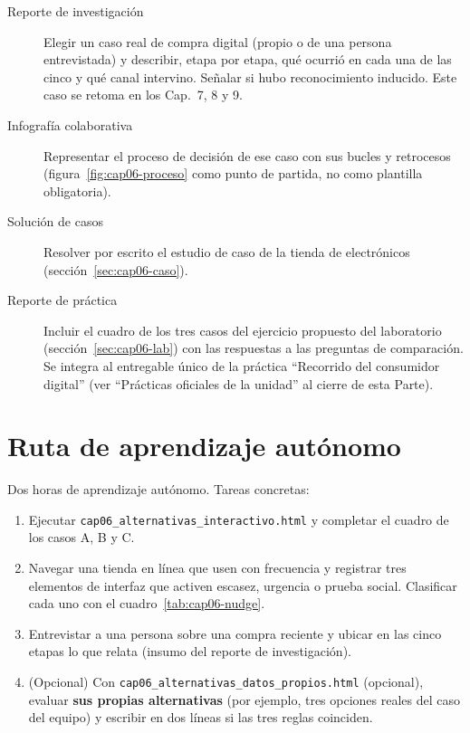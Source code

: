 \begin{description}
  \item[Reporte de investigación] Elegir un caso real de compra digital
  (propio o de una persona entrevistada) y describir, etapa por etapa, qué
  ocurrió en cada una de las cinco y qué canal intervino. Señalar si hubo
  reconocimiento inducido. Este caso se retoma en los Cap.~7, 8 y 9.
  \item[Infografía colaborativa] Representar el proceso de decisión de ese
  caso con sus bucles y retrocesos (figura~\ref{fig:cap06-proceso} como
  punto de partida, no como plantilla obligatoria).
  \item[Solución de casos] Resolver por escrito el estudio de caso de la
  tienda de electrónicos (sección~\ref{sec:cap06-caso}).
  \item[Reporte de práctica] Incluir el cuadro de los tres casos del
  ejercicio propuesto del laboratorio (sección~\ref{sec:cap06-lab}) con las respuestas a las
  preguntas de comparación. Se integra al entregable único de la práctica
  \enquote{Recorrido del consumidor digital} (ver \enquote{Prácticas
  oficiales de la unidad} al cierre de esta Parte).
\end{description}

\section{Ruta de aprendizaje autónomo}

Dos horas de aprendizaje autónomo. Tareas concretas:
\begin{enumerate}
  \item Ejecutar \texttt{cap06\_alternativas\_interactivo.html} y completar
  el cuadro de los casos A, B y C.
  \item Navegar una tienda en línea que usen con frecuencia y registrar tres
  elementos de interfaz que activen escasez, urgencia o prueba social.
  Clasificar cada uno con el cuadro~\ref{tab:cap06-nudge}.
  \item Entrevistar a una persona sobre una compra reciente y ubicar en las
  cinco etapas lo que relata (insumo del reporte de investigación).
  \item (Opcional) Con \texttt{cap06\_alternativas\_datos\_propios.html} (opcional), evaluar \textbf{sus propias alternativas} (por ejemplo, tres opciones reales del caso del equipo) y escribir en dos líneas si las tres reglas coinciden.
\end{enumerate}

